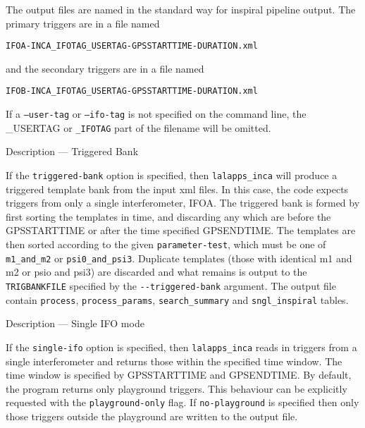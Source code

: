 \begin{entry}
The output files are named in the standard way for inspiral pipeline output.
The primary triggers are in a file named\\
\begin{center}
\texttt{IFOA-INCA\_IFOTAG\_USERTAG-GPSSTARTTIME-DURATION.xml}\\
\end{center}
and the secondary triggers are in a file named\\
\begin{center}
\texttt{IFOB-INCA\_IFOTAG\_USERTAG-GPSSTARTTIME-DURATION.xml}\\
\end{center}

If a \texttt{--user-tag} or \texttt{--ifo-tag} is not specified on the
command line, the \textsc{\_USERTAG} or \texttt{\_IFOTAG} part of the
filename will be omitted.


\item[Description --- Triggered Bank] 
  
If the \texttt{triggered-bank} option is specified, then
\texttt{lalapps\_inca} will produce a triggered template bank from the
input xml files.  In this case, the code expects triggers from only a
single interferometer, {IFOA}.  The triggered bank is formed by first
sorting the templates in time, and discarding any which are before the
\textsc{GPSSTARTTIME} or after the time specified \textsc{GPSENDTIME}.
The templates are then sorted according to the given
\texttt{parameter-test}, which must be one of \texttt{m1\_and\_m2} or
\texttt{psi0\_and\_psi3}.  Duplicate templates (those with identical m1
    and m2 or psio and psi3) are discarded and what
remains is output to the \texttt{TRIGBANKFILE} specified by the
\verb$--triggered-bank$ argument.  The output file contain
\texttt{process}, \texttt{process\_params}, \texttt{search\_summary} and
\texttt{sngl\_inspiral} tables.  

\item[Description --- Single IFO mode]

If the \texttt{single-ifo} option is specified, then
\texttt{lalapps\_inca} reads in triggers from a single interferometer
and returns those within the specified time window.  The time window is
specified by \textsc{GPSSTARTTIME} and \textsc{GPSENDTIME}.
By default, the program returns only playground triggers.  This
behaviour can be explicitly requested with the \texttt{playground-only}
flag.  If \texttt{no-playground} is specified then only those triggers
outside the playground are written to the output file.


\end{entry}
